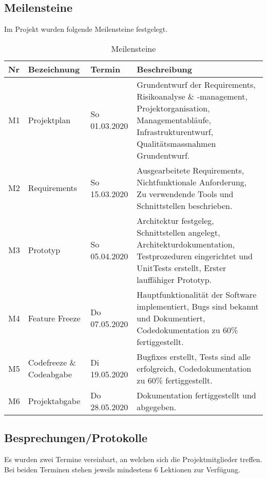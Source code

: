 \documentclass[
	ngerman,
	toc=listof, %
	toc=bibliography, %
	footnotes=multiple, %
	parskip=half, %
	numbers=noendperiod %
]{scrartcl}
\begin{document}
	\subsection{Meilensteine}
	Im Projekt wurden folgende Meilensteine festgelegt.
		\begin{table}[!h]	
			\begin{tabularx}{0.9\linewidth}{lllX}
				\toprule
				Nr & Bezeichnung & Termin & Beschreibung \\
				\midrule
				M1 & Projektplan & So 01.03.2020 & Grundentwurf der Requirements, Risikoanalyse \& -management, Projektorganisation, Managementabläufe, Infrastrukturentwurf, Qualitätsmassnahmen Grundentwurf.\\
				\midrule
				M2 & Requirements & So 15.03.2020 & Ausgearbeitete Requirements, Nichtfunktionale Anforderung, Zu verwendende Tools und Schnittstellen beschrieben.\\
				\midrule 
				M3 & Prototyp & So 05.04.2020 & Architektur festgeleg, Schnittstellen angelegt, Architekturdokumentation, Testprozeduren eingerichtet und UnitTests erstellt, Erster lauffähiger Prototyp.\\
				\midrule
				M4 & Feature Freeze & Do 07.05.2020 & Hauptfunktionalität der Software implementiert, Bugs sind bekannt und Dokumentiert, Codedokumentation zu 60\% fertiggestellt.\\
				\midrule
				M5 & Codefreeze \& Codeabgabe & Di 19.05.2020 & Bugfixes erstellt, Tests sind alle erfolgreich, Codedokumentation zu 60\% fertiggestellt.\\
				\midrule
				M6 & Projektabgabe & Do 28.05.2020 & Dokumentation fertiggestellt und abgegeben.\\
				\bottomrule
			\end{tabularx}
		\caption{Meilensteine}
		\end{table}	

	\subsection{Besprechungen/Protokolle}
	\label{sec:dates}
		Es wurden zwei Termine vereinbart, an welchen sich die Projektmitglieder treffen. 
		Bei beiden Terminen stehen jeweils mindestens 6 Lektionen zur Verfügung.
\end{document}
